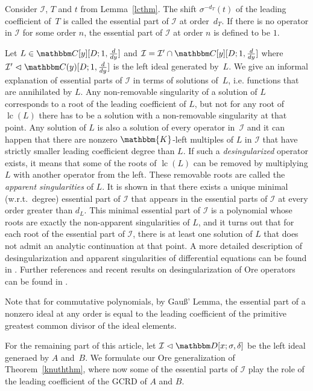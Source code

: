 \documentclass[3p,11pt,preprint]{elsarticle}
\let\set\mathbbm
\def\k{\set D}
\newcommand{\qk}{\set{K}}
\newcommand{\D}{x}
\newcommand{\alg}{\k[\D;\sigma,\delta]}
\newcommand{\lc}{\operatorname{lc}}
\begin{document}
 \begin{definition}
  Consider $\mathcal{I}$, $T$ and $t$ from Lemma~\ref{lcthm}. The shift $\sigma^{-d_T}(t)$ of the leading coefficient of~$T$ is called the essential part of $\mathcal{I}$ at order~$d_T$. If there is no operator in $\mathcal{I}$ for some order $n$, the essential part of $\mathcal{I}$ at order $n$ is defined to be $1$.
 \end{definition}

Let $L\in\set C[y][D;1,\frac{d}{dy}]$ and $\mathcal{I}=\mathcal{I}'\cap\set C[y][D;1,\frac{d}{dy}]$ where $\mathcal{I}'\vartriangleleft\set  C(y)[D;1,\frac{d}{dy}]$ is the left ideal generated by~$L$. We give an informal explanation of essential parts of $\mathcal{I}$ in terms of solutions of~$L$, i.e. functions that are annihilated by $L$. Any non-removable singularity of a solution of $L$ corresponds to a root of the leading coefficient of $L$, but not for any root of $\lc(L)$ there has to be a solution with a non-removable singularity at that point. Any solution of $L$ is also a solution of every operator in~$\mathcal{I}$ and it can happen that there are nonzero $\qk$-left multiples of $L$ in $\mathcal{I}$ that have strictly smaller leading coefficient degree than $L$. If such a \textit{desingularized} operator exists, it means that some of the roots of $\lc(L)$ can be removed by multiplying $L$ with another operator from the left. These removable roots are called the \textit{apparent singularities} of 
$L$. It is shown in \cite{mythesis} that there exists a unique minimal (w.r.t.\ degree) essential part of $\mathcal{I}$ that appears in the essential parts of $\mathcal{I}$ at every order greater than $d_L$. This minimal essential part of $\mathcal{I}$ is a polynomial whose roots are exactly the non-apparent singularities of $L$, and it turns out that for each root of the essential part of $\mathcal{I}$, there is at least one solution of $L$ that does not admit an analytic continuation at that point. A more detailed description of desingularization and apparent singularities of differential equations can be found in \cite{ince}. Further references and recent results on desingularization of Ore operators can be found in \cite{chen}.

Note that for commutative polynomials, by Gau\ss' Lemma, the essential part of a nonzero ideal at any order is equal to the leading coefficient of the primitive greatest common divisor of the ideal elements. 

For the remaining part of this article, let $\mathcal{I}\vartriangleleft\alg$ be the left ideal generaed by $A$ and~$B$. We formulate our Ore generalization of Theorem~\ref{knuththm}, where now some of the essential parts of $\mathcal{I}$ play the role of the leading coefficient of the GCRD of $A$ and $B$.
\end{document}
